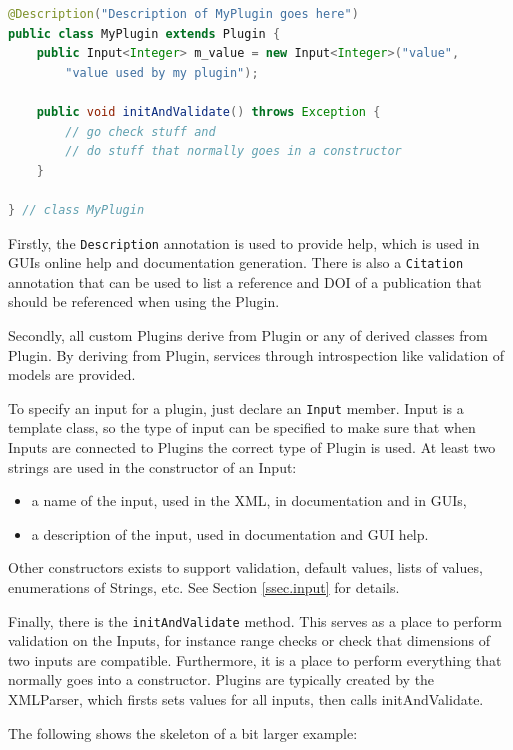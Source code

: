 \documentclass{article}
\begin{document}
{\color{blue}\begin{lstlisting}[language=java]
@Description("Description of MyPlugin goes here")
public class MyPlugin extends Plugin {
    public Input<Integer> m_value = new Input<Integer>("value",
        "value used by my plugin");

    public void initAndValidate() throws Exception {
        // go check stuff and 
        // do stuff that normally goes in a constructor
    }

} // class MyPlugin
\end{lstlisting}}

Firstly, the {\tt Description} annotation is used to provide help, which is used in GUIs
online help and documentation generation. There is also a {\tt Citation} annotation
that can be used to list a reference and DOI of a publication that should be
referenced when using the Plugin.

Secondly, all custom Plugins derive from Plugin or any of derived classes from Plugin.
By deriving from Plugin,  services through introspection like validation of models are
provided.

To specify an input for a plugin, just declare an {\tt Input} member. Input is a template
class, so the type of input can be specified to make sure that when Inputs are connected
to Plugins the correct type of Plugin is used. At least two strings are used in the 
constructor of an Input:
\begin{itemize}
\item a name of the input, used in the XML, in documentation and in GUIs,
\item a description of the input, used in documentation and GUI help.
\end{itemize}
Other constructors exists to support validation, default values, lists of values,
enumerations of Strings, etc. See Section \ref{ssec.input} for details.

Finally, there is the {\tt initAndValidate} method. This serves as a place to perform
validation on the Inputs, for instance range checks or check that dimensions of two
inputs are compatible. Furthermore, it is a place to perform everything that normally
goes into a constructor. Plugins are typically created by the XMLParser, which firsts
sets values for all inputs, then calls initAndValidate.

The following shows the skeleton of a bit larger example:
\end{document}
